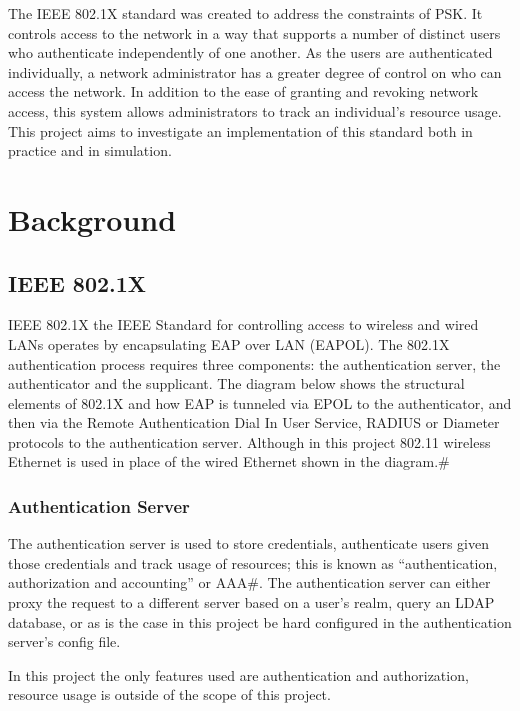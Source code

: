 \documentclass[pdftex, 12pt, a4paper]{article}
\begin{document}
The IEEE 802.1X standard was created to address the constraints of PSK. It controls access to the network in a way that supports a number of distinct users who authenticate independently of one another. As the users are authenticated individually, a network administrator has a greater degree of control on who can access the network. In addition to the ease of granting and revoking network access, this system allows administrators to track an individual's resource usage.  This project aims to investigate an implementation of this standard both in practice and in simulation.

\section{Background}
\subsection{IEEE 802.1X}
IEEE 802.1X the IEEE Standard for controlling access to wireless and wired LANs operates by encapsulating EAP over LAN (EAPOL).  The 802.1X authentication process requires three components: the authentication server, the authenticator and the supplicant.  The diagram below shows the structural elements of 802.1X and how EAP is tunneled via EPOL to the authenticator, and then via the Remote Authentication Dial In User Service, RADIUS or Diameter protocols to the authentication server. Although in this project 802.11 wireless Ethernet is used in place of the wired Ethernet shown in the diagram.\#


\subsubsection{Authentication Server}
The authentication server is used to store credentials, authenticate users given those credentials and track usage of resources; this is known as ``authentication, authorization and accounting'' or AAA\#.  The authentication server can either proxy the request to a different server based on a user's realm, query an LDAP database, or as is the case in this project be hard configured in the authentication server's config file.

In this project the only features used are authentication and authorization, resource usage is outside of the scope of this project.
\end{document}
